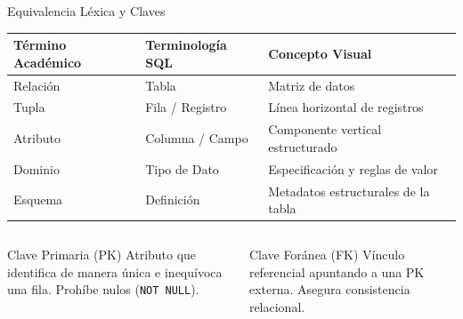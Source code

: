 \documentclass[12pt, aspectratio=169, UTF8]{beamer}
\begin{document}
\begin{frame}{Equivalencia Léxica y Claves}
  \begin{center}
  \small
  \renewcommand{\arraystretch}{1.2}
  \begin{tabularx}{0.9\textwidth}{@{} X X X @{}}
    \toprule
    \textbf{Término Académico} & \textbf{Terminología SQL} & \textbf{Concepto Visual} \\
    \midrule
    Relación  & Tabla            & Matriz de datos \\
    Tupla     & Fila / Registro  & Línea horizontal de registros \\
    Atributo  & Columna / Campo  & Componente vertical estructurado \\
    Dominio   & Tipo de Dato     & Especificación y reglas de valor \\
    Esquema   & Definición       & Metadatos estructurales de la tabla \\
    \bottomrule
  \end{tabularx}
  \end{center}
  \begin{columns}[T]
      \begin{block}{Clave Primaria (PK)}
        Atributo que identifica de manera única e inequívoca una fila. Prohíbe nulos (\texttt{NOT NULL}).
      \end{block}
      \begin{block}{Clave Foránea (FK)}
        Vínculo referencial apuntando a una PK externa. Asegura consistencia relacional.
      \end{block}
  \end{columns}
\end{frame}
\end{document}
